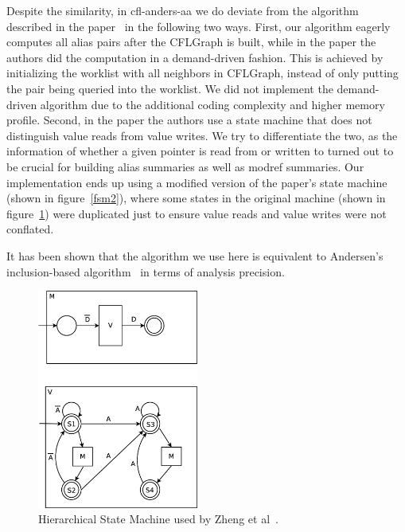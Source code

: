 \documentclass[10pt]{article}
\begin{document}
Despite the similarity, in cfl-anders-aa we do deviate from the algorithm
described in the paper~\cite{Zheng:2008} in the following two ways. First, our
algorithm eagerly computes all alias pairs after the CFLGraph is built, while in
the paper the authors did the computation in a demand-driven fashion. This is
achieved by initializing the worklist with all neighbors in CFLGraph,
instead of only putting the pair being queried into the worklist. We did not
implement the demand-driven algorithm due to the additional coding complexity
and higher memory profile. Second, in the paper the authors use a state machine
that does not distinguish value reads from value writes. We try to differentiate
the two, as the information of
whether a given pointer is read from or written to turned out to be crucial for
building alias summaries as well as modref summaries. Our implementation ends up using a modified version of
the paper's state machine (shown in figure~\ref{fsm2}), where some states in the original machine (shown in figure~\ref{fsm1}) were
duplicated just to ensure value reads and value writes were not conflated. 

It has been shown that the algorithm we use here is
equivalent to Andersen's inclusion-based algorithm~\cite{Andersen:1994} in terms
of analysis precision.

\begin{figure}
  \centering
  \includegraphics[width=150pt]{FSM1.eps}
  \caption{Hierarchical State Machine used by Zheng et al~\cite{Zheng:2008}.\label{fsm1} }
\end{figure}
\end{document}

